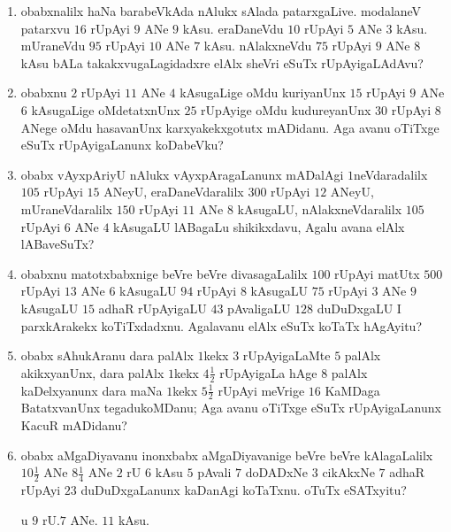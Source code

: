 \begin{enumerate}[\rm(1)]
\item obabxnalilx haNa barabeVkAda nAlukx sAlada patarxgaLive. modalaneV patarxvu $16$ rUpAyi $9$ ANe $9$ kAsu. eraDaneVdu $10$ rUpAyi $5$ ANe $3$ kAsu. mUraneVdu $95$ rUpAyi $10$ ANe $7$ kAsu. nAlakxneVdu $75$ rUpAyi $9$ ANe $8$ kAsu bALa takakxvugaLagidadxre elAlx sheVri eSuTx rUpAyigaLAdAvu?

\item obabxnu $2$ rUpAyi $11$ ANe $4$ kAsugaLige oMdu kuriyanUnx $15$ rUpAyi $9$ ANe $6$ kAsugaLige oMdetatxnUnx $25$ rUpAyige oMdu kudureyanUnx $30$ rUpAyi $8$ ANege oMdu hasavanUnx karxyakekxgotutx mADidanu. Aga avanu oTiTxge eSuTx rUpAyigaLanunx koDabeVku?

\item obabx vAyxpAriyU nAlukx vAyxpAragaLanunx mADalAgi $1$neVdaradalilx $105$ rUpAyi $15$ ANeyU, eraDaneVdaralilx $300$ rUpAyi $12$ ANeyU, mUraneVdaralilx $150$ rUpAyi $11$ ANe $8$ kAsuga\-LU, nAlakxneVdaralilx $105$ rUpAyi $6$ ANe $4$ kAsugaLU lABagaLu shikikxdavu, Agalu avana elAlx lABaveSuTx?

\item obabxnu matotxbabxnige beVre beVre divasagaLalilx $100$ rUpAyi matUtx $500$ rUpAyi $13$ ANe $6$ kAsugaLU $94$ rUpAyi $8$ kAsugaLU $75$ rUpAyi $3$ ANe $9$ kAsugaLU $15$ adhaR rUpAyigaLU $43$ pAvaligaLU $128$ duDuDxgaLU I parxkArakekx koTiTxdadxnu. Agalavanu elAlx eSuTx koTaTx hAgAyitu?

\item obabx sAhukAranu dara palAlx $1$kekx $3$ rUpAyigaLaMte $5$ palAlx akikxyanUnx, dara palAlx $1$kekx $4\frac{1}{2}$ rUpAyigaLa hAge $8$ palAlx kaDelxyanunx dara maNa $1$kekx $5\frac{1}{2}$ rUpAyi meVrige $16$ KaMDaga BatatxvanUnx tegadukoMDanu; Aga avanu oTiTxge eSuTx rUpAyigaLanunx KacuR mADidanu?

\item obabx aMgaDiyavanu inonxbabx aMgaDiyavanige beVre beVre kAlagaLalilx $10\frac{1}{2}$ ANe $8\frac{1}{4}$ ANe $2$ rU $6$ kAsu $5$ pAvali $7$ doDADxNe $3$ cikAkxNe $7$ adhaR rUpAyi $23$ duDuDxgaLanunx kaDanAgi koTaTxnu. oTuTx eSATxyitu? 

\hfill u $9$ rU.$7$ ANe. $11$ kAsu.


\end{enumerate}
